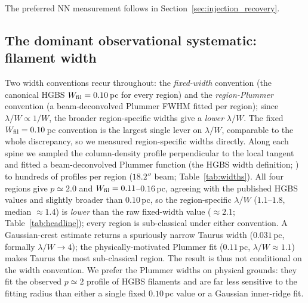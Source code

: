 \documentclass[usenatbib,twoside,twocolumn]{mnras}
\begin{document}
The preferred NN measurement follows in Section~\ref{sec:injection_recovery}.

\subsection{The dominant observational systematic: filament width}
\label{sec:widths}

Two width conventions recur throughout: the \emph{fixed-width} convention (the canonical HGBS $W_{\rm fil}=0.10$\,pc for every region) and the \emph{region-Plummer} convention (a beam-deconvolved Plummer FWHM fitted per region); since $\lambda/W\propto1/W$, the broader region-specific widths give a \emph{lower} $\lambda/W$. The fixed $W_{\rm fil}=0.10$\,pc convention is the largest single lever on $\lambda/W$, comparable to the whole discrepancy, so we measured region-specific widths directly. Along each spine we sampled the column-density profile perpendicular to the local tangent and fitted a beam-deconvolved Plummer function (the HGBS width definition; \citealt{Arzoumanian2019}) to hundreds of profiles per region ($18.2''$ beam; Table~\ref{tab:widths}). All four regions give $p\simeq2.0$ and $W_{\rm fil}=0.11$--$0.16$\,pc, agreeing with the published HGBS values and slightly broader than $0.10$\,pc, so the region-specific $\lambda/W$ ($1.1$--$1.8$, median $\approx1.4$) is \emph{lower} than the raw fixed-width value ($\approx2.1$; Table~\ref{tab:headline}); every region is sub-classical under either convention. A Gaussian-crest estimate returns a spuriously narrow Taurus width ($0.031$\,pc, formally $\lambda/W\to4$); the physically-motivated Plummer fit ($0.11$\,pc, $\lambda/W\approx1.1$) makes Taurus the most sub-classical region. The result is thus not conditional on the width convention. We prefer the Plummer widths on physical grounds: they fit the observed $p\simeq2$ profile of HGBS filaments and are far less sensitive to the fitting radius than either a single fixed $0.10$\,pc value or a Gaussian inner-ridge fit.
\end{document}
